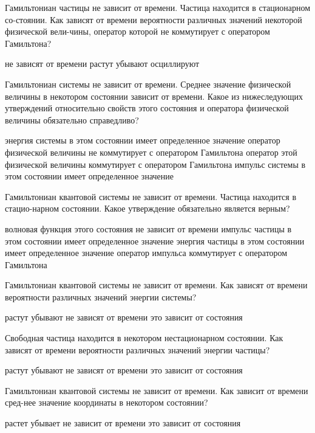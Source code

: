 \documentclass[11pt,a4paper]{exam}
\begin{document}
\begin{questions}
\question Гамильтониан частицы не зависит от времени. Частица находится в стационарном со-стоянии. Как зависят от времени вероятности различных значений некоторой физической вели-чины, оператор которой не коммутирует с оператором Гамильтона?
\begin{choices}
\choice не зависят от времени 
\choice растут 
\choice убывают      
\choice осциллируют
\end{choices}

\question Гамильтониан системы не зависит от времени. Среднее значение физической величины в некотором состоянии зависит от времени. Какое из нижеследующих утверждений относительно свойств этого состояния и оператора физической величины обязательно справедливо?
\begin{choices}
\choice энергия системы в этом состоянии имеет определенное значение
\choice оператор физической величины не коммутирует с оператором Гамильтона
\choice оператор этой физической величины коммутирует с оператором Гамильтона
\choice импульс системы в этом состоянии имеет определенное значение
\end{choices}

\question Гамильтониан квантовой системы не зависит от времени. Частица находится в стацио-нарном состоянии. Какое утверждение обязательно является верным? 
\begin{choices}
\choice волновая функция этого состояния не зависит от времени
\choice импульс частицы в этом состоянии имеет определенное значение
\choice энергия частицы в этом состоянии имеет определенное значение
\choice оператор импульса коммутирует с оператором Гамильтона
\end{choices}

\question Гамильтониан квантовой системы не зависит от времени. Как зависят от времени вероятности различных значений энергии системы?
\begin{choices}
\choice растут 
\choice убывают   
\choice не зависят от времени 
\choice это зависит от состояния
\end{choices}

\question Свободная частица находится в некотором нестационарном состоянии. Как зависят от времени вероятности различных значений энергии частицы?
\begin{choices}
\choice растут 
\choice убывают   
\choice не зависят от времени 
\choice это зависит от состояния
\end{choices}

\question Гамильтониан квантовой системы не зависит от времени. Как зависит от времени сред-нее значение координаты в некотором состоянии?
\begin{choices}
\choice растет 
\choice убывает   
\choice не зависит от времени 
\choice это зависит от состояния
\end{choices}


\end{questions}
\end{document}
